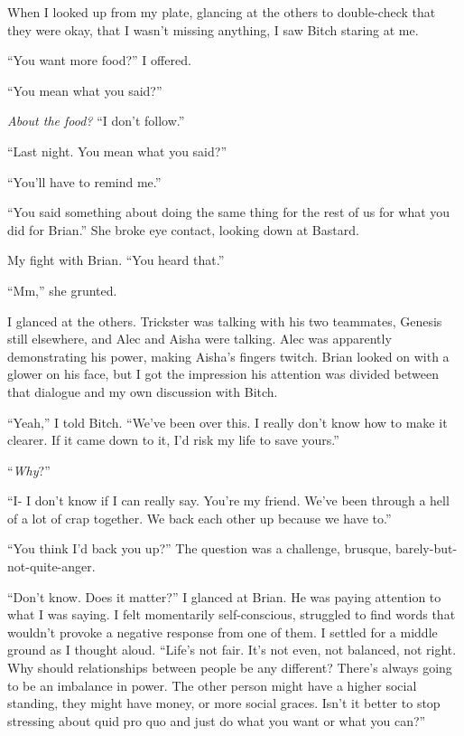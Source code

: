 When I looked up from my plate, glancing at the others to double-check that they were okay, that I wasn't missing anything, I saw Bitch staring at me.



``You want more food?''  I offered.



``You mean what you said?''



\emph{About the food?}  ``I don't follow.''



``Last night.  You mean what you said?''



``You'll have to remind me.''



``You said something about doing the same thing for the rest of us for what you did for Brian.''  She broke eye contact, looking down at Bastard.



My fight with Brian.  ``You heard that.''



``Mm,'' she grunted.



I glanced at the others.  Trickster was talking with his two teammates, Genesis still elsewhere, and Alec and Aisha were talking.  Alec was apparently demonstrating his power, making Aisha's fingers twitch.  Brian looked on with a glower on his face, but I got the impression his attention was divided between that dialogue and my own discussion with Bitch.



``Yeah,'' I told Bitch.  ``We've been over this.  I really don't know how to make it clearer.  If it came down to it, I'd risk my life to save yours.''



``\emph{Why}?''



``I- I don't know if I can really say.  You're my friend.  We've been through a hell of a lot of crap together.  We back each other up because we have to.''



``You think I'd back you up?''  The question was a challenge, brusque, barely-but-not-quite-anger.



``Don't know.  Does it matter?''  I glanced at Brian.  He was paying attention to what I was saying.  I felt momentarily self-conscious, struggled to find words that wouldn't provoke a negative response from one of them.  I settled for a middle ground as I thought aloud.  ``Life's not fair.  It's not even, not balanced, not right.  Why should relationships between people be any different?  There's always going to be an imbalance in power.  The other person might have a higher social standing, they might have money, or more social graces.  Isn't it better to stop stressing about quid pro quo and just do what you want or what you can?''



